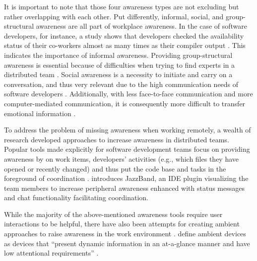 It is important to note that those four awareness types are not excluding but rather overlapping with each other. Put differently, informal, social, and group-structural awareness are all part of workplace awareness. In the case of software developers, for instance, a study shows that developers checked the availability status of their co-workers almost as many times as their compiler output \autocite{ko2007information}. This indicates the importance of informal awareness. Providing group-structural awareness is essential because of difficulties when trying to find experts in a distributed team \autocite{herbsleb2003empirical}. Social awareness is a necessity to initiate and carry on a conversation, and thus very relevant due to the high communication needs of software developers \autocite{perry1994people}. Additionally, with less face-to-face communication and more computer-mediated communication, it is consequently more difficult to transfer emotional information \autocite{rivera1996effects}.

To address the problem of missing awareness when working remotely, a wealth of research developed approaches to increase awareness in distributed teams. Popular tools made explicitly for software development teams focus on providing awareness by on work items, developers’ activities (e.g., which files they have opened or recently changed) and thus put the code base and tasks in the foreground of coordination \autocite{biehl2007fastdash, jakobsen2009wipdash, eick1992seesoft, deline2005easing}. \textcite{cheng2003jazzing} introduces JazzBand, an IDE plugin visualizing the team members to increase peripheral awareness enhanced with status messages and chat functionality facilitating coordination.

While the majority of the above-mentioned awareness tools require user interactions to be helpful, there have also been attempts for creating ambient approaches to raise awareness in the work environment \autocite{morrison2020facilitating, otjacques2006ambient, downs2012ambient, alavi2012ambient, rocker2004using}. \citeauthor{downs2012ambient} define ambient devices as devices that \enquote{present dynamic information in an at-a-glance manner and have low attentional requirements} \autocite[p.~508]{downs2012ambient}.


